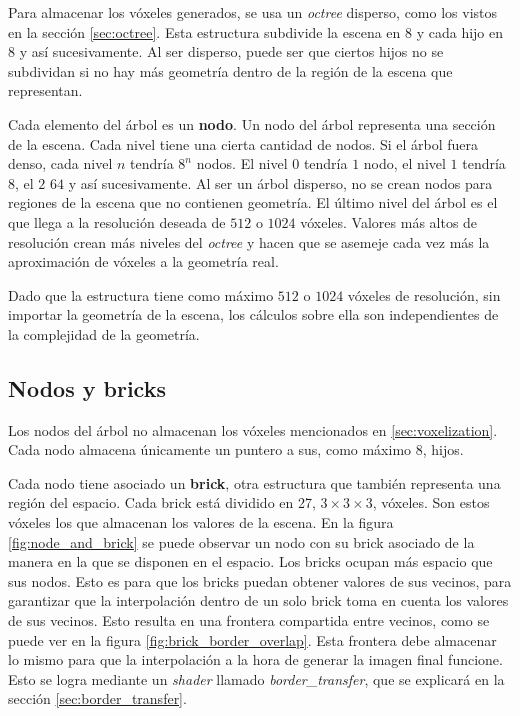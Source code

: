 Para almacenar los vóxeles generados, se usa un \textit{octree} disperso, como los vistos en la sección \ref{sec:octree}.
Esta estructura subdivide la escena en $8$ y cada hijo en $8$ y así sucesivamente.
Al ser disperso, puede ser que ciertos hijos no se subdividan si no hay más geometría dentro de la región de la escena que representan.

Cada elemento del árbol es un \textbf{nodo}.
Un nodo del árbol representa una sección de la escena.
Cada nivel tiene una cierta cantidad de nodos.
Si el árbol fuera denso, cada nivel $n$ tendría $8^n$ nodos.
El nivel $0$ tendría $1$ nodo, el nivel $1$ tendría $8$, el $2$ $64$ y así sucesivamente.
Al ser un árbol disperso, no se crean nodos para regiones de la escena que no contienen geometría.
El último nivel del árbol es el que llega a la resolución deseada de $512$ o $1024$ vóxeles.
Valores más altos de resolución crean más niveles del \textit{octree} y hacen que se asemeje cada vez más la aproximación de vóxeles a la geometría real.


Dado que la estructura tiene como máximo $512$ o $1024$ vóxeles de resolución, sin importar la geometría de la escena, los cálculos sobre ella son independientes de la complejidad de la geometría.

\subsection{Nodos y bricks}\label{sec:nodes_and_bricks}

Los nodos del árbol no almacenan los vóxeles mencionados en \ref{sec:voxelization}.
Cada nodo almacena únicamente un puntero a sus, como máximo $8$, hijos.

Cada nodo tiene asociado un \textbf{brick}, otra estructura que también representa una región del espacio.
Cada brick está dividido en 27, $3\times3\times3$, vóxeles.
Son estos vóxeles los que almacenan los valores de la escena.
En la figura \ref{fig:node_and_brick} se puede observar un nodo con su brick asociado de la manera en la que se disponen en el espacio.
Los bricks ocupan más espacio que sus nodos.
Esto es para que los bricks puedan obtener valores de sus vecinos, para garantizar que la interpolación dentro de un solo brick toma en cuenta los valores de sus vecinos.
Esto resulta en una frontera compartida entre vecinos, como se puede ver en la figura \ref{fig:brick_border_overlap}.
Esta frontera debe almacenar lo mismo para que la interpolación a la hora de generar la imagen final funcione.
Esto se logra mediante un \textit{shader} llamado \textit{border\_transfer}, que se explicará en la sección \ref{sec:border_transfer}.

